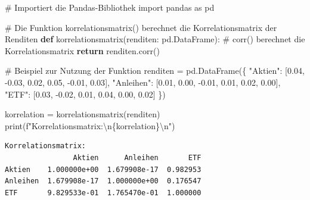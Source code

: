 \documentclass[
  ngerman,
  a4paper,
  DIV=11,
  oneside]{scrreprt}
\newenvironment{Shaded}{\begin{snugshade}}{\end{snugshade}}
\newcommand{\BuiltInTok}[1]{\textcolor[rgb]{0.00,0.23,0.31}{#1}}
\newcommand{\CharTok}[1]{\textcolor[rgb]{0.13,0.47,0.30}{#1}}
\newcommand{\CommentTok}[1]{\textcolor[rgb]{0.37,0.37,0.37}{#1}}
\newcommand{\ControlFlowTok}[1]{\textcolor[rgb]{0.00,0.23,0.31}{\textbf{#1}}}
\newcommand{\FloatTok}[1]{\textcolor[rgb]{0.68,0.00,0.00}{#1}}
\newcommand{\ImportTok}[1]{\textcolor[rgb]{0.00,0.46,0.62}{#1}}
\newcommand{\KeywordTok}[1]{\textcolor[rgb]{0.00,0.23,0.31}{\textbf{#1}}}
\newcommand{\NormalTok}[1]{\textcolor[rgb]{0.00,0.23,0.31}{#1}}
\newcommand{\OperatorTok}[1]{\textcolor[rgb]{0.37,0.37,0.37}{#1}}
\newcommand{\SpecialCharTok}[1]{\textcolor[rgb]{0.37,0.37,0.37}{#1}}
\newcommand{\SpecialStringTok}[1]{\textcolor[rgb]{0.13,0.47,0.30}{#1}}
\newcommand{\StringTok}[1]{\textcolor[rgb]{0.13,0.47,0.30}{#1}}
\begin{document}
\begin{Shaded}
\begin{Highlighting}[]
\CommentTok{\# Importiert die Pandas{-}Bibliothek}
\ImportTok{import}\NormalTok{ pandas }\ImportTok{as}\NormalTok{ pd}

\CommentTok{\# Die Funktion korrelationsmatrix() berechnet die Korrelationsmatrix der Renditen}
\KeywordTok{def}\NormalTok{ korrelationsmatrix(renditen: pd.DataFrame):}
    \CommentTok{\# corr() berechnet die Korrelationsmatrix}
    \ControlFlowTok{return}\NormalTok{ renditen.corr()}

\CommentTok{\# Beispiel zur Nutzung der Funktion}
\NormalTok{renditen }\OperatorTok{=}\NormalTok{ pd.DataFrame(\{}
    \StringTok{"Aktien"}\NormalTok{: [}\FloatTok{0.04}\NormalTok{, }\OperatorTok{{-}}\FloatTok{0.03}\NormalTok{, }\FloatTok{0.02}\NormalTok{, }\FloatTok{0.05}\NormalTok{, }\OperatorTok{{-}}\FloatTok{0.01}\NormalTok{, }\FloatTok{0.03}\NormalTok{],}
    \StringTok{"Anleihen"}\NormalTok{: [}\FloatTok{0.01}\NormalTok{, }\FloatTok{0.00}\NormalTok{, }\OperatorTok{{-}}\FloatTok{0.01}\NormalTok{, }\FloatTok{0.01}\NormalTok{, }\FloatTok{0.02}\NormalTok{, }\FloatTok{0.00}\NormalTok{],}
    \StringTok{"ETF"}\NormalTok{: [}\FloatTok{0.03}\NormalTok{, }\OperatorTok{{-}}\FloatTok{0.02}\NormalTok{, }\FloatTok{0.01}\NormalTok{, }\FloatTok{0.04}\NormalTok{, }\FloatTok{0.00}\NormalTok{, }\FloatTok{0.02}\NormalTok{]}
\NormalTok{\})}

\NormalTok{korrelation }\OperatorTok{=}\NormalTok{ korrelationsmatrix(renditen)}
\BuiltInTok{print}\NormalTok{(}\SpecialStringTok{f"Korrelationsmatrix:}\CharTok{\textbackslash{}n}\SpecialCharTok{\{}\NormalTok{korrelation}\SpecialCharTok{\}}\CharTok{\textbackslash{}n}\SpecialStringTok{"}\NormalTok{)}
\end{Highlighting}
\end{Shaded}

\begin{verbatim}
Korrelationsmatrix:
                Aktien      Anleihen       ETF
Aktien    1.000000e+00  1.679908e-17  0.982953
Anleihen  1.679908e-17  1.000000e+00  0.176547
ETF       9.829533e-01  1.765470e-01  1.000000
\end{verbatim}
\end{document}
